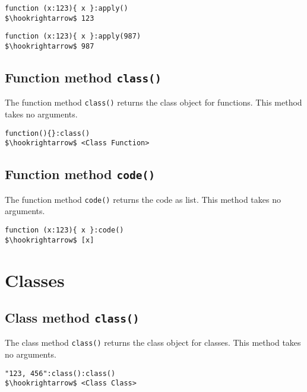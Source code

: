 \documentclass[11pt,a4paper]{scrbook}
\begin{document}
\begin{lstlisting}[language=BibTool,mathescape=true]
function (x:123){ x }:apply()
$\hookrightarrow$ 123
\end{lstlisting}

\begin{lstlisting}[language=BibTool,mathescape=true]
function (x:123){ x }:apply(987)
$\hookrightarrow$ 987
\end{lstlisting}


\subsection{Function method \texttt{class()}}

The function method \texttt{class()} returns the class object for functions.
This method takes no arguments.

\begin{lstlisting}[language=BibTool,mathescape=true]
function(){}:class()
$\hookrightarrow$ <Class Function>
\end{lstlisting}

\subsection{Function method \texttt{code()}}

The function method \texttt{code()} returns the code as list. This method
takes no arguments.

\begin{lstlisting}[language=BibTool,mathescape=true]
function (x:123){ x }:code()
$\hookrightarrow$ [x]
\end{lstlisting}


\section{Classes}\label{sec:classes}


\subsection{Class method \texttt{class()}}

The class method \texttt{class()} returns the class object for classes. This
method takes no arguments.

\begin{lstlisting}[language=BibTool,mathescape=true]
"123, 456":class():class()
$\hookrightarrow$ <Class Class>
\end{lstlisting}
\end{document}
